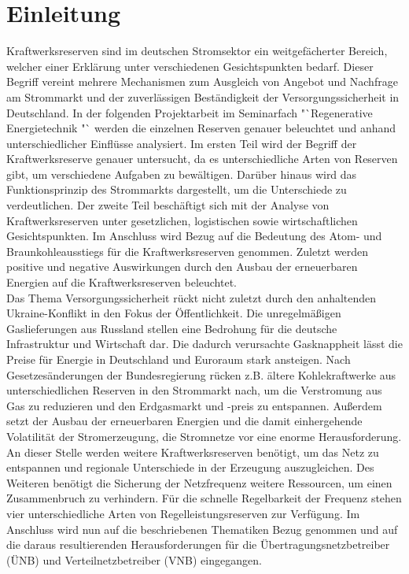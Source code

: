 \section{Einleitung}

	Kraftwerksreserven sind im deutschen Stromsektor ein weitgefächerter Bereich, welcher einer Erklärung unter verschiedenen Gesichtspunkten bedarf.
	Dieser Begriff vereint mehrere Mechanismen zum Ausgleich von Angebot und Nachfrage am Strommarkt und der zuverlässigen Beständigkeit der Versorgungssicherheit in Deutschland.
	In der folgenden Projektarbeit im Seminarfach "`Regenerative Energietechnik "` werden die einzelnen Reserven genauer beleuchtet und anhand unterschiedlicher Einflüsse analysiert.
	Im ersten Teil wird der Begriff der Kraftwerksreserve genauer untersucht, da es unterschiedliche Arten von Reserven gibt, um verschiedene Aufgaben zu bewältigen.
	Darüber hinaus wird das Funktionsprinzip des Strommarkts dargestellt, um die Unterschiede zu verdeutlichen.
	Der zweite Teil beschäftigt sich mit der Analyse von Kraftwerksreserven unter gesetzlichen, logistischen sowie wirtschaftlichen Gesichtspunkten.
	Im Anschluss wird Bezug auf die Bedeutung des Atom- und Braunkohleausstiegs für die Kraftwerksreserven genommen.	
	Zuletzt werden positive und negative Auswirkungen durch den Ausbau der erneuerbaren Energien auf die Kraftwerksreserven beleuchtet. \\
	
	Das Thema Versorgungssicherheit rückt nicht zuletzt durch den anhaltenden Ukraine-Konflikt in den Fokus der Öffentlichkeit.
	Die unregelmäßigen Gaslieferungen aus Russland stellen eine Bedrohung für die deutsche Infrastruktur und Wirtschaft dar.
	Die dadurch verursachte Gasknappheit lässt die Preise für Energie in Deutschland und Euroraum stark ansteigen.
	Nach Gesetzesänderungen der Bundesregierung rücken z.B. ältere Kohlekraftwerke aus unterschiedlichen Reserven in den Strommarkt nach, um die Verstromung aus Gas zu reduzieren und den Erdgasmarkt und -preis zu entspannen.
	Außerdem setzt der Ausbau der erneuerbaren Energien und die damit einhergehende Volatilität der Stromerzeugung, die Stromnetze vor eine enorme Herausforderung. 
	An dieser Stelle werden weitere Kraftwerksreserven benötigt, um das Netz zu entspannen und regionale Unterschiede in der Erzeugung auszugleichen. 
	Des Weiteren benötigt die Sicherung der Netzfrequenz weitere Ressourcen, um einen Zusammenbruch zu verhindern. 
	Für die schnelle Regelbarkeit der Frequenz stehen vier unterschiedliche Arten von Regelleistungsreserven zur Verfügung. 
	Im Anschluss wird nun auf die beschriebenen Thematiken Bezug genommen und auf die daraus resultierenden Herausforderungen für die Übertragungsnetzbetreiber (ÜNB) und Verteilnetzbetreiber (VNB) eingegangen. 
	
	
	
	
	
	
	\clearpage